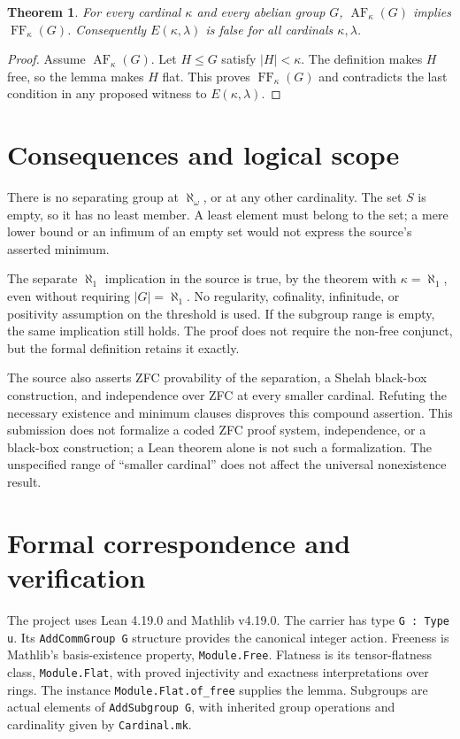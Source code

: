 \documentclass[11pt]{article}
\newtheorem{theorem}{Theorem}
\newcommand{\AF}{\operatorname{AF}}
\newcommand{\FF}{\operatorname{FF}}
\begin{document}
\begin{theorem}
For every cardinal $\kappa$ and every abelian group $G$,
$\AF_\kappa(G)$ implies $\FF_\kappa(G)$.
Consequently $E(\kappa,\lambda)$ is false for all cardinals $\kappa,\lambda$.
\end{theorem}
\begin{proof}
Assume $\AF_\kappa(G)$. Let $H\leq G$ satisfy $|H|<\kappa$.
The definition makes $H$ free, so the lemma makes $H$ flat.
This proves $\FF_\kappa(G)$ and contradicts the last condition in
any proposed witness to $E(\kappa,\lambda)$.
\end{proof}

\newpage
\section{Consequences and logical scope}
There is no separating group at $\aleph_\omega$, or at any other
cardinality. The set $S$ is empty, so it has no least member.
A least element must belong to the set; a mere lower bound or an infimum
of an empty set would not express the source's asserted minimum.

The separate $\aleph_1$ implication in the source is true, by the theorem
with $\kappa=\aleph_1$, even without requiring $|G|=\aleph_1$.
No regularity, cofinality, infinitude, or positivity assumption on the
threshold is used. If the subgroup range is empty, the same implication
still holds. The proof does not require the non-free conjunct, but the
formal definition retains it exactly.

The source also asserts ZFC provability of the separation, a Shelah black-box
construction, and independence over ZFC at every smaller cardinal.
Refuting the necessary existence and minimum clauses disproves this compound
assertion. This submission does not formalize a coded ZFC proof system,
independence, or a black-box construction; a Lean theorem alone is not such
a formalization. The unspecified range of ``smaller cardinal'' does not
affect the universal nonexistence result.

\section{Formal correspondence and verification}
The project uses Lean 4.19.0 and Mathlib v4.19.0. The carrier has type
\texttt{G : Type u}. Its \texttt{AddCommGroup G} structure provides the
canonical integer action. Freeness is Mathlib's basis-existence property,
\texttt{Module.Free}. Flatness is its tensor-flatness class,
\texttt{Module.Flat}, with proved injectivity and exactness interpretations
over rings. The instance \texttt{Module.Flat.of\_free} supplies the lemma.
Subgroups are actual elements of \texttt{AddSubgroup G}, with inherited
group operations and cardinality given by \texttt{Cardinal.mk}.
\end{document}
